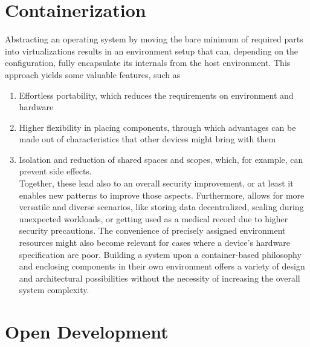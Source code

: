 \documentclass[12pt,english,a4paper,titlepage,cleardoublepage=empty,dottedtoc]{report}
\providecommand{\tightlist}{%
  \setlength{\itemsep}{0pt}\setlength{\parskip}{0pt}}
\begin{document}
\section{Containerization}\label{containerization}

Abstracting an operating system by moving the bare minimum of required
parts into virtualizations results in an environment setup that can,
depending on the configuration, fully encapsulate its internals from the
host environment. This approach yields some valuable features, such as

\begin{enumerate}
\def\labelenumi{(\Alph{enumi})}
\tightlist
\item
  Effortless portability, which reduces the requirements on environment
  and hardware
\item
  Higher flexibility in placing components, through which advantages can
  be made out of characteristics that other devices might bring with
  them
\item
  Isolation and reduction of shared spaces and scopes, which, for
  example, can prevent side effects.\\
  Together, these lead also to an overall security improvement, or at
  least it enables new patterns to improve those aspects. Furthermore,
  allows for more versatile and diverse scenarios, like storing data
  decentralized, scaling during unexpected workloads, or getting used as
  a medical record due to higher security precautions. The convenience
  of precisely assigned environment resources might also become relevant
  for cases where a device's hardware specification are poor. Building a
  system upon a container-based philosophy and enclosing components in
  their own environment offers a variety of design and architectural
  possibilities without the necessity of increasing the overall system
  complexity.
\end{enumerate}

\section{Open Development}\label{open-development}
\end{document}
